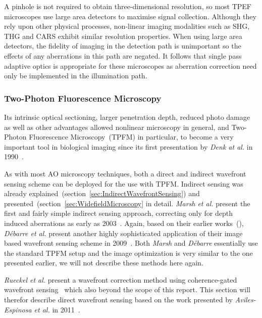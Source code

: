 A pinhole is not required to obtain three-dimensional resolution, so most 
TPEF microscopes use large area detectors to maximise signal collection. 
Although they rely upon other physical processes, non-linear imaging 
modalities such as SHG, THG and CARS exhibit similar resolution properties. 
When using large area detectors, the fidelity of imaging in the detection 
path is unimportant so the effects of any aberrations in this path are 
negated. It follows that single pass adaptive optics is appropriate for these 
microscopes as aberration correction need only be implemented in the 
illumination path.

\cite{book_confocal}
\cite{scan_CFM}

\subsubsection{Two-Photon Fluorescence Microscopy}
\label{sec:twoPhotonExcitation}

Its intrinsic optical sectioning, larger penetration depth, reduced photo damage as well as other advantages allowed nonlinear microscopy in general, and Two-Photon Fluorescence Microscopy~(TPFM) in particular, to become a very important tool in biological imaging since its first presentation by \emph{Denk at al.} in 1990~\cite{scan_TPFM_principle}.

As with most AO microscopy techniques, both a direct and indirect wavefront sensing scheme can be deployed for the use with TPFM. Indirect sensing was already explained~(section~\ref{sec:IndirectWavefrontSensing}) and presented~(section~\ref{sec:WidefieldMicroscopy} in detail. \emph{Marsh et al.} present the first and fairly simple indirect sensing approach, correcting only for depth induced aberrations as early as 2003~\cite{scan_TPFM_pratical}. Again, based on their earlier works~(\cite{wide_AOM_loew_freq,wide_AOM_structured_illu}), \emph{D\'{e}barre et al.} present another highly sophisticated application of their image based wavefront sensing scheme in 2009~\cite{scan_TPFM_image_based}. Both \emph{Marsh} and \emph{D\'{e}barre} essentially use the standard TPFM setup and the image optimization is very similar to the one presented earlier, we will not describe these methods here again.

\emph{Rueckel et al.} present a wavefront correction method using coherence-gated wavefront sensing~\cite{scan_TPFM_gated_wavefront} which also beyond the scope of this report. This section will therefor describe direct wavefront sensing based on the work presented by \emph{Aviles-Espinosa et al.} in 2011~\cite{scan_TPFM_guide_start}.

